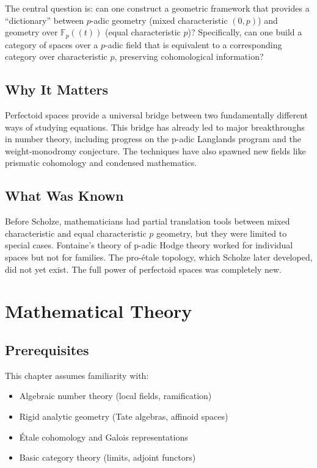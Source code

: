 The central question is: can one construct a geometric framework that provides a ``dictionary'' between $p$-adic geometry (mixed characteristic $(0,p)$) and geometry over $\mathbb{F}_p((t))$ (equal characteristic $p$)? Specifically, can one build a category of spaces over a $p$-adic field that is equivalent to a corresponding category over characteristic $p$, preserving cohomological information?

\subsection{Why It Matters}
Perfectoid spaces provide a universal bridge between two fundamentally different ways of studying equations. This bridge has already led to major breakthroughs in number theory, including progress on the p-adic Langlands program and the weight-monodromy conjecture. The techniques have also spawned new fields like prismatic cohomology and condensed mathematics.

\subsection{What Was Known}
Before Scholze, mathematicians had partial translation tools between mixed characteristic and equal characteristic $p$ geometry, but they were limited to special cases. Fontaine's theory of p-adic Hodge theory worked for individual spaces but not for families. The pro-\'etale topology, which Scholze later developed, did not yet exist. The full power of perfectoid spaces was completely new.

\section{Mathematical Theory}


\subsection{Prerequisites}
This chapter assumes familiarity with:
\begin{itemize}
\item Algebraic number theory (local fields, ramification)
\item Rigid analytic geometry (Tate algebras, affinoid spaces)
\item \'Etale cohomology and Galois representations
\item Basic category theory (limits, adjoint functors)
\end{itemize}


